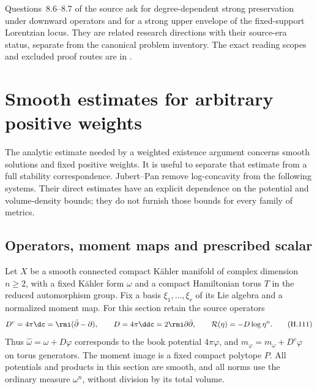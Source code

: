 Questions~8.6--8.7 of the source ask for degree-dependent
strong preservation under downward operators and for a
strong upper envelope of the fixed-support Lorentzian locus.
They are related research directions with their source-era
status, separate from the canonical problem inventory.
The exact reading scopes and excluded proof routes are in
.

\section{Smooth estimates for arbitrary positive weights}
\label{sec:appH-positive-weight-estimates}

The analytic estimate needed by a weighted existence argument concerns
smooth solutions and fixed positive weights. It is useful to separate
that estimate from a full stability correspondence. Jubert--Pan
\cite{JubertPan26PositiveWeightsV1} remove log-concavity from the
following systems. Their direct estimates have an explicit dependence on
the potential and volume-density bounds; they do not furnish those bounds
for every family of metrics.

\subsection{Operators, moment maps and prescribed scalar}

Let $X$ be a smooth connected compact K\"ahler manifold of complex
dimension $n\geq2$, with a fixed K\"ahler form $\omega$ and a compact
Hamiltonian torus $T$ in the reduced automorphism group. Fix a basis
$\xi_1,\ldots,\xi_r$ of its Lie algebra and a normalized moment map.
For this section retain the source operators
\[
 D^c=4\pi\dc=\rmi(\bar\partial-\partial),\qquad
 D=4\pi\ddc=2\rmi\partial\bar\partial,\qquad
 \mathcal R(\eta)=-D\log\eta^n.
 \tag{H.111}\label{eq:appH-weighted-source-units}
\]
Thus $\widehat\omega=\omega+D\varphi$ corresponds to the book
potential $4\pi\varphi$, and
$m_\varphi=m_\omega+D^c\varphi$ on torus generators. The moment
image is a fixed compact polytope $P$. All potentials and products in
this section are smooth, and all norms use the ordinary measure
$\omega^n$, without division by its total volume.

